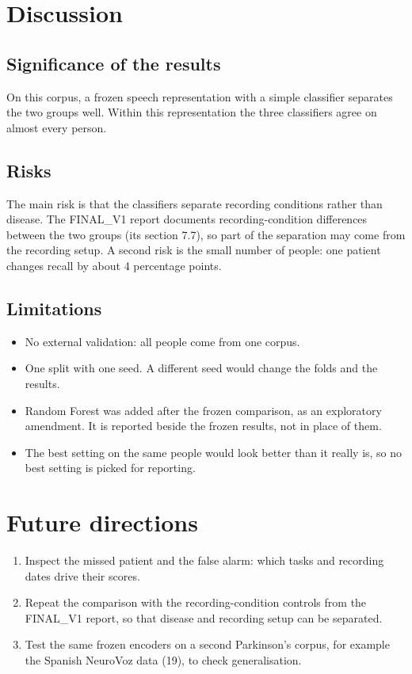 \documentclass[11pt,a4paper]{article}
\begin{document}
\section{Discussion}\label{sec:discussion}
\subsection{Significance of the results}\label{sec:significance}
On this corpus, a frozen speech representation with a simple classifier separates the two groups well. Within this representation the three classifiers agree on almost every person.

\subsection{Risks}\label{sec:risks}
The main risk is that the classifiers separate recording conditions rather than disease. The FINAL\_V1 report documents recording-condition differences between the two groups (its section 7.7), so part of the separation may come from the recording setup. A second risk is the small number of people: one patient changes recall by about 4 percentage points.

\subsection{Limitations}\label{sec:limitations}
\begin{itemize}\item No external validation: all people come from one corpus.
\item One split with one seed. A different seed would change the folds and the results.
\item Random Forest was added after the frozen comparison, as an exploratory amendment. It is reported beside the frozen results, not in place of them.
\item The best setting on the same people would look better than it really is, so no best setting is picked for reporting.
\end{itemize}
\section{Future directions}\label{sec:future}
\begin{enumerate}\item Inspect the missed patient and the false alarm: which tasks and recording dates drive their scores.
\item Repeat the comparison with the recording-condition controls from the FINAL\_V1 report, so that disease and recording setup can be separated.
\item Test the same frozen encoders on a second Parkinson's corpus, for example the Spanish NeuroVoz data (19), to check generalisation.
\end{enumerate}
\end{document}
